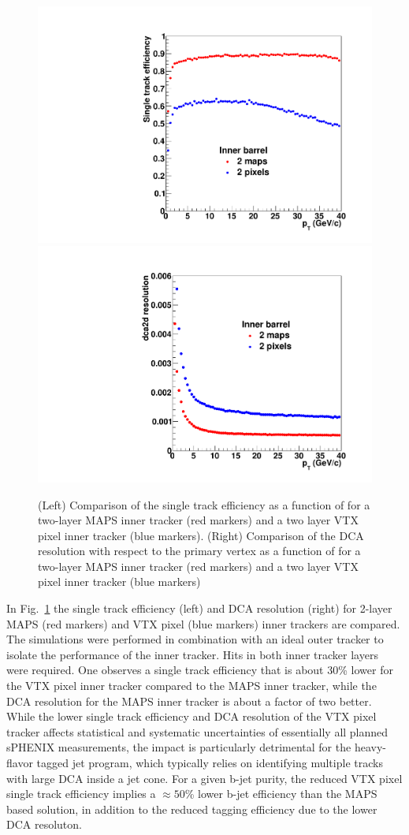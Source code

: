 \begin{figure}[hbt]
  \centering
  \includegraphics[width=0.4\linewidth]{figs/single_track_efficiency_2maps_vs_2pixels}
  \hspace{0.1\linewidth}  \includegraphics[width=0.4\linewidth]{figs/dca2d_resolution_2maps_vs_2pixels}
  \caption{(Left) Comparison of the single track efficiency as a function of \pt for a two-layer MAPS
  inner tracker (red markers) and a two layer VTX pixel inner tracker (blue markers). 
   (Right) Comparison of the DCA resolution with respect to the primary vertex as a function of \pt for a two-layer MAPS
  inner tracker (red markers) and a two layer VTX pixel inner tracker (blue markers)  }
  \label{fig:2LayerMAPSvsPXL}
\end{figure}

In Fig.~\ref{fig:2LayerMAPSvsPXL} the single track efficiency (left) and DCA resolution (right) for 2-layer MAPS (red markers) 
and VTX pixel (blue markers) inner trackers are compared. The simulations were performed in combination with an ideal outer tracker 
to isolate the performance of the inner tracker. Hits in both inner tracker layers were required. One observes a single track 
efficiency that is about 30\% lower for the VTX pixel inner tracker compared to the MAPS inner tracker, while the DCA resolution 
for the MAPS inner tracker is about a factor of two better. While the lower single track efficiency and DCA resolution of the VTX pixel tracker 
affects statistical and systematic uncertainties of essentially all planned sPHENIX measurements, the impact is particularly
detrimental for the heavy-flavor tagged jet program, which typically relies on identifying multiple tracks with large DCA inside
a jet cone. For a given b-jet purity, the reduced VTX pixel single track efficiency implies a $\approx 50$\% lower b-jet efficiency 
than the MAPS based solution, in addition to the reduced tagging efficiency due to the lower DCA resoluton.

